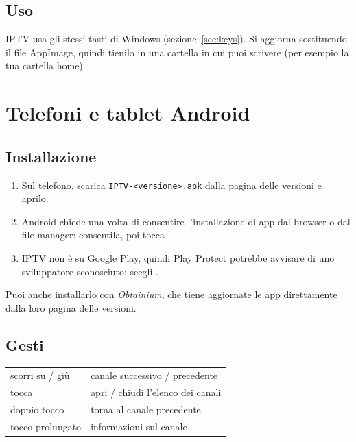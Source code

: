 
\subsection{Uso}
IPTV usa gli stessi tasti di Windows (sezione~\ref{sec:keys}). Si aggiorna
sostituendo il file AppImage, quindi tienilo in una cartella in cui puoi
scrivere (per esempio la tua cartella home).

\section{Telefoni e tablet Android}

\subsection{Installazione}
\begin{enumerate}
  \item Sul telefono, scarica \texttt{IPTV-\textless versione\textgreater.apk}
        dalla pagina delle versioni e aprilo.
  \item Android chiede una volta di consentire l'installazione di app dal
        browser o dal file manager: consentila, poi tocca .
  \item IPTV non è su Google Play, quindi Play Protect potrebbe avvisare di
        uno sviluppatore sconosciuto: scegli .
\end{enumerate}
Puoi anche installarlo con \emph{Obtainium}, che tiene aggiornate le app
direttamente dalla loro pagina delle versioni.

\subsection{Gesti}
\begin{xltabular}{\linewidth}{@{}KX@{}}
scorri su / giù & canale successivo / precedente \\
tocca & apri / chiudi l'elenco dei canali \\
doppio tocco & torna al canale precedente \\
tocco prolungato & informazioni sul canale \\
\bottomrule
\end{xltabular}

